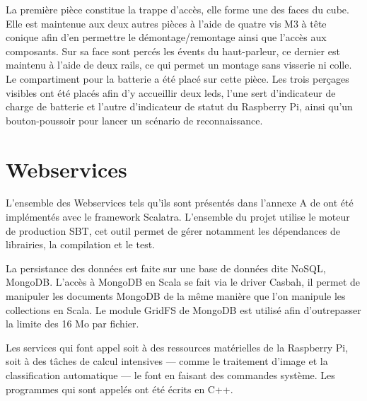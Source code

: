     La première pièce constitue la trappe d'accès, elle forme une des faces du cube.
    Elle est maintenue aux deux autres pièces à l'aide de quatre vis M3 à tête conique afin d'en permettre le démontage/remontage ainsi que l'accès aux composants.
    Sur sa face sont percés les évents du haut-parleur, ce dernier est maintenu à l'aide de deux rails, ce qui permet un montage sans visserie ni colle.
    Le compartiment pour la batterie a été placé sur cette pièce.
    Les trois perçages visibles ont été placés afin d'y accueillir deux leds, l'une sert d'indicateur de charge de batterie et l'autre d'indicateur de statut du Raspberry Pi, ainsi qu'un bouton-poussoir pour lancer un scénario de reconnaissance.
    
    
    
    \label{mecdrawing}
    
    \section{Webservices}
    
    L'ensemble des Webservices tels qu'ils sont présentés dans l'annexe A de \cite{OBCdS} ont été implémentés avec le framework Scalatra.
    L'ensemble du projet utilise le moteur de production SBT, cet outil permet de gérer notamment les dépendances de librairies, la compilation et le test.
    
    La persistance des données est faite sur une base de données dite NoSQL, MongoDB.
    L'accès à MongoDB en Scala se fait via le driver Casbah, il permet de manipuler les documents MongoDB de la même manière que l'on manipule les collections en Scala.
    Le module GridFS de MongoDB est utilisé afin d'outrepasser la limite des 16 Mo par fichier.
    
    Les services qui font appel soit à des ressources matérielles de la Raspberry Pi, soit à des tâches de calcul intensives --- comme le traitement d'image et la classification automatique --- le font en faisant des commandes système.
    Les programmes qui sont appelés ont été écrits en C++.
    
    
    